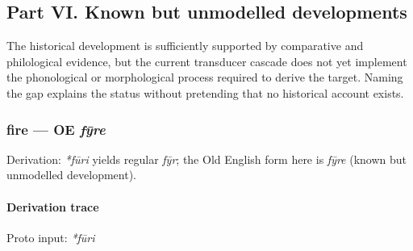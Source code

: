 \documentclass[
  british,
  a4paper,
]{article}
\begin{document}
\clearpage

\subsection{Part VI. Known but unmodelled
developments}\label{part-vi.-known-but-unmodelled-developments}

The historical development is sufficiently supported by comparative and
philological evidence, but the current transducer cascade does not yet
implement the phonological or morphological process required to derive
the target. Naming the gap explains the status without pretending that
no historical account exists.

\subsubsection{\texorpdfstring{fire --- OE
\emph{fȳre}}{fire --- OE fȳre}}\label{fire-oe-fux233re}

Derivation: \emph{*fūri} yields regular \emph{fȳr}; the Old English form
here is \emph{fȳre} (known but unmodelled development).

\paragraph{Derivation trace}\label{derivation-trace-153}

Proto input: \emph{*fūri}

\begingroup
\setlength{\fboxsep}{6pt}
\end{document}

